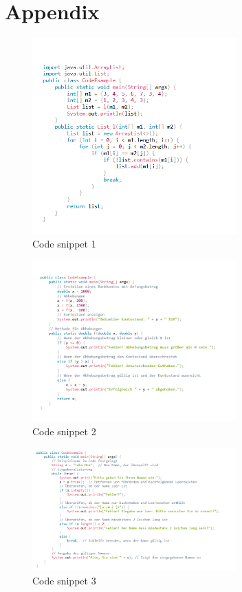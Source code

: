 \chapter*{Appendix}
  
\begin{figure}[H]
    \centering
    \includegraphics[width=0.7\textwidth]{figures/schnitt.png}
    \caption{Code snippet 1}
    \label{fig:appendix-example}
\end{figure}

\begin{figure}[H]
    \centering
    \includegraphics[width=0.7\textwidth]{figures/konto.png}
    \caption{Code snippet 2}
    \label{fig:appendix-example}
\end{figure}

\begin{figure}[H]
    \centering
    \includegraphics[width=0.7\textwidth]{figures/name.png}
    \caption{Code snippet 3}
    \label{fig:appendix-example}
\end{figure}

